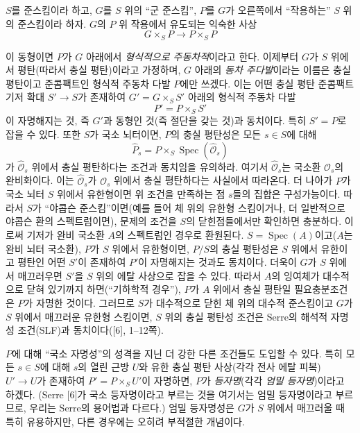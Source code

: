 $S$를 준스킴이라 하고, $G$를 $S$ 위의 ``군 준스킴'', $P$를 $G$가
오른쪽에서 ``작용하는'' $S$ 위의 준스킴이라 하자. $G$의 $P$ 위 작용에서
유도되는 익숙한 사상
\[
  G\times_SP\longrightarrow P\times_SP
\]

이 동형이면 $P$가 $G$ 아래에서 \emph{형식적으로 주동차적}이라고 한다.
이제부터 $G$가 $S$ 위에서 평탄(따라서 충실 평탄)이라고 가정하며,
$G$ 아래의 \emph{동차 주다발}이라는 이름은 충실 평탄이고 준콤팩트인
형식적 주동차 다발 $P$에만 쓰겠다. 이는 어떤 충실 평탄 준콤팩트 기저
확대 $S'\longrightarrow S$가 존재하여 $G'=G\times_SS'$ 아래의 형식적
주동차 다발
\[
  P'=P\times_SS'
\]
이 자명해지는 것, 즉 $G'$과 동형인 것(즉 절단을 갖는 것)과 동치이다.
특히 $S'=P$로 잡을 수 있다. 또한 $S$가 국소 뇌터이면, $P$의 충실
평탄성은 모든 $s\in S$에 대해
\[
  \widehat P_s=P\times_S\operatorname{Spec}(\widehat{\mathcal O}_s)
\]
가 $\widehat{\mathcal O}_s$ 위에서 충실 평탄하다는 조건과 동치임을
유의하라. 여기서 $\widehat{\mathcal O}_s$는 국소환 $\mathcal O_s$의
완비화이다. 이는 $\widehat{\mathcal O}_s$가 $\mathcal O_s$ 위에서 충실
평탄하다는 사실에서 따라온다. 더 나아가 $P$가 국소 뇌터 $S$ 위에서
유한형이면 위 조건을 만족하는 점 $s$들의 집합은 구성가능이다. 따라서
$S$가 ``야콥슨 준스킴''이면(예를 들어 체 위의 유한형 스킴이거나, 더
일반적으로 야콥슨 환의 스펙트럼이면), 문제의 조건을 $S$의 닫힌점들에서만
확인하면 충분하다. 이로써 기저가 완비 국소환 $A$의 스펙트럼인 경우로
환원된다. $S=\operatorname{Spec}(A)$이고($A$는 완비 뇌터 국소환), $P$가
$S$ 위에서 유한형이면, $P/S$의 충실 평탄성은 $S$ 위에서 유한이고
평탄인 어떤 $S'$이 존재하여 $P'$이 자명해지는 것과도 동치이다. 더욱이
$G$가 $S$ 위에서 매끄러우면 $S'$을 $S$ 위의 에탈 사상으로 잡을 수
있다. 따라서 $A$의 잉여체가 대수적으로 닫혀 있기까지 하면(``기하학적
경우''), $P$가 $A$ 위에서 충실 평탄일 필요충분조건은 $P$가 자명한
것이다. 그러므로 $S$가 대수적으로 닫힌 체 위의 대수적 준스킴이고
$G$가 $S$ 위에서 매끄러운 유한형 스킴이면, $S$ 위의 충실 평탄성 조건은
Serre의 해석적 자명성 조건(SLF)과 동치이다([6], 1--12쪽).

$P$에 대해 ``국소 자명성''의 성격을 지닌 더 강한 다른 조건들도 도입할
수 있다. 특히 모든 $s\in S$에 대해 $s$의 열린 근방 $U$와 유한 충실
평탄 사상(각각 전사 에탈 피복) $U'\longrightarrow U$가 존재하여
$P'=P\times_SU'$이 자명하면, $P$가 \emph{등자명}(각각 \emph{엄밀
등자명})이라고 하겠다. (Serre [6]가 국소 등자명이라고 부르는 것을
여기서는 엄밀 등자명이라고 부르므로, 우리는 Serre의 용어법과 다르다.)
엄밀 등자명성은 $G$가 $S$ 위에서 매끄러울 때 특히 유용하지만, 다른
경우에는 오히려 부적절한 개념이다.

